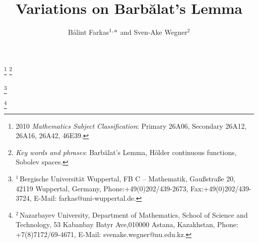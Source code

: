 \documentclass[10pt, a4paper, reqno]{amsart}
\theoremstyle{normal}
\begin{document}
\title{Variations on Barb\u{a}lat's Lemma}

\author{B\'{a}lint Farkas\hspace{0.5pt}\MakeLowercase{$^{\text{1,\,a}}$} and Sven-Ake Wegner\hspace{0.5pt}\MakeLowercase{$^{\text{2}}$}}


\renewcommand{\thefootnote}{}
\hspace{-1000pt}\footnote{\hspace{5.5pt}2010 \emph{Mathematics Subject Classification}: Primary 26A06, Secondary 26A12, 26A16, 26A42, 46E39.}
\hspace{-1000pt}\footnote{\hspace{5.5pt}\emph{Key words and phrases}: Barb\u{a}lat's Lemma, H\"older continuous functions, Sobolev spaces.\vspace{1.6pt}}

\hspace{-1000pt}\footnote{\hspace{0pt}$^{1}$\,Bergische Universit\"at Wuppertal, FB C -- Mathematik, Gau\ss{}stra\ss{}e 20, 42119 Wuppertal, Germany, Phone:\hspace{1.2pt}\hspace{1.2pt}+49\hspace{1.2pt}(0)\linebreak\phantom{x}\hspace{1.2pt}202\hspace{1.2pt}/\hspace{1.2pt}439\hspace{1.2pt}-\hspace{1.2pt}2673, Fax:\hspace{1.2pt}\hspace{1.2pt}+49\hspace{1.2pt}(0)\hspace{1.2pt}202\hspace{1.2pt}/\hspace{1.2pt}439\hspace{1.2pt}-\hspace{1.2pt}3724, E-Mail: farkas@uni-wuppertal.de.\vspace{1.6pt}}

\hspace{-1000pt}\footnote{\hspace{0pt}$^{2}$\,Nazarbayev University, Department of Mathematics, School of Science and Technology, 53 Kabanbay Batyr Ave,\linebreak\phantom{x}\hspace{1.2pt}010000 Astana, Kazakhstan, Phone: +7\hspace{1.2pt}(8)\hspace{1.2pt}7172\hspace{1.2pt}/\hspace{1.2pt}69\hspace{1.2pt}-\hspace{1.2pt}4671, E-Mail: svenake.wegner@nu.edu.kz.\vspace{1.6pt}}
\end{document}
